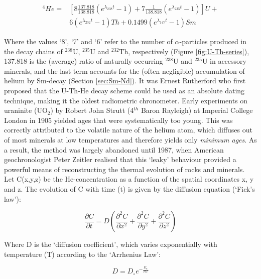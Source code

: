 \documentclass{book}
\begin{document}
\begin{equation}
\begin{array}{rl}
^4He = & \left[8 \frac{137.818}{138.818} (e^{\lambda_{238}t} - 1) + 7 \frac{1}{138.818} (e^{\lambda_{235}t} - 1) \right] U +\\[8pt]
~ & 6 (e^{\lambda_{232}t} - 1) Th + 0.1499 (e^{\lambda_{147}t} - 1) Sm
\end{array}
\label{eq:U-Th-He}
\end{equation}

Where the values `8', `7' and `6' refer to the number of
$\alpha$-particles produced in the decay chains of $^{238}$U,
$^{235}$U and $^{232}$Th, respectively (Figure \ref{fig:U-Th-series}),
137.818 is the (average) ratio of naturally occurring $^{238}$U and
$^{235}$U in accessory minerals, and the last term accounts for the (often negligible)
accumulation of helium by Sm-decay (Section \ref{sec:Sm-Nd}). It was
Ernest Rutherford who first proposed that the U-Th-He decay scheme
could be used as an absolute dating technique, making it the oldest
radiometric chronometer. Early experiments on uraninite (UO$_2$) by
Robert John Strutt (4$^{th}$ Baron Rayleigh) at Imperial College
London in 1905 yielded ages that were systematically too young. This
was correctly attributed to the volatile nature of the helium atom,
which diffuses out of most minerals at low temperatures and therefore
yields only \emph{minimum ages}. As a result, the method was largely
abandoned until 1987, when American geochronologist Peter Zeitler
realised that this `leaky' behaviour provided a powerful means of
reconstructing the thermal evolution of rocks and minerals. \\

Let C(x,y,z) be the He-concentration as a function of the spatial
coordinates x, y and z.  The evolution of C with time (t) is given by
the diffusion equation (`Fick's law'):

\begin{equation}
\frac{\partial C}{\partial t} = D \left(
\frac{\partial^2C}{\partial x^2} + \frac{\partial^2C}{\partial y^2} +
\frac{\partial^2C}{\partial z^2}\right)
\label{eq:fick}
\end{equation}

Where D is the `diffusion coefficient', which varies exponentially
with temperature (T) according to the `Arrhenius Law':

\begin{equation}
D = D_\circ e^{-\frac{E_a}{RT}}
\label{eq:Arrhenius}
\end{equation}
\end{document}
